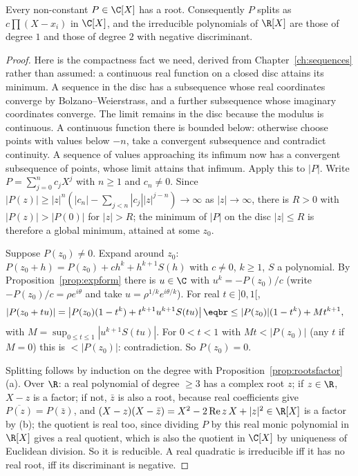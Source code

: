 \begin{theorem}\label{thm:dalembert}
Every non-constant $P\in\C[X]$ has a root. Consequently $P$ splits as $c\prod(X-x_i)$ in $\C[X]$, and the irreducible polynomials of $\R[X]$ are those of degree $1$ and those of degree $2$ with negative discriminant.
\end{theorem}
\begin{proof}
Here is the compactness fact we need, derived from Chapter~\ref{ch:sequences} rather than assumed: a continuous real function on a closed disc attains its minimum. A sequence in the disc has a subsequence whose real coordinates converge by Bolzano--Weierstrass, and a further subsequence whose imaginary coordinates converge. The limit remains in the disc because the modulus is continuous. A continuous function there is bounded below: otherwise choose points with values below $-n$, take a convergent subsequence and contradict continuity. A sequence of values approaching its infimum now has a convergent subsequence of points, whose limit attains that infimum. Apply this to $|P|$.
Write $P=\sum_{j=0}^nc_jX^j$ with $n\ge1$ and $c_n\ne0$.
Since $|P(z)|\ge|z|^n\left(|c_n|-\sum_{j<n}|c_j||z|^{j-n}\right)\to\infty$ as $|z|\to\infty$, there is $R>0$ with $|P(z)|>|P(0)|$ for $|z|>R$; the minimum of $|P|$ on the disc $|z|\le R$ is therefore a global minimum, attained at some $z_0$.

Suppose $P(z_0)\ne0$. Expand around $z_0$: $P(z_0+h)=P(z_0)+ch^k+h^{k+1}S(h)$ with $c\ne0$, $k\ge1$, $S$ a polynomial. By Proposition~\ref{prop:expform} there is $u\in\C$ with $u^k=-P(z_0)/c$ (write $-P(z_0)/c=\rho e^{i\theta}$ and take $u=\rho^{1/k}e^{i\theta/k}$). For real $t\in]0,1[$,
\[
\begin{aligned}|P(z_0+tu)|&=\left|P(z_0)(1-t^k)+t^{k+1}u^{k+1}S(tu)\right|\eqbr\le|P(z_0)|(1-t^k)+Mt^{k+1},\end{aligned}
\]
with $M=\sup_{0\le t\le1}|u^{k+1}S(tu)|$. For $0<t<1$ with $Mt<|P(z_0)|$ (any $t$ if $M=0$) this is $<|P(z_0)|$: contradiction. So $P(z_0)=0$.

Splitting follows by induction on the degree with Proposition~\ref{prop:rootsfactor}(a). Over $\R$: a real polynomial of degree $\ge3$ has a complex root $z$; if $z\in\R$, $X-z$ is a factor; if not, $\bar z$ is also a root, because real coefficients give $\overline{P(z)}=P(\bar z)$, and $(X-z)(X-\bar z)=X^2-2\operatorname{Re}z\,X+|z|^2\in\R[X]$ is a factor by (b); the quotient is real too, since dividing $P$ by this real monic polynomial in $\R[X]$ gives a real quotient, which is also the quotient in $\C[X]$ by uniqueness of Euclidean division. So it is reducible. A real quadratic is irreducible iff it has no real root, iff its discriminant is negative.
\end{proof}

